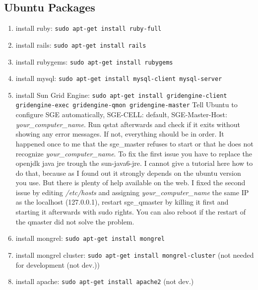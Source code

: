 \documentclass{scrartcl}
\begin{document}
			\subsection{Ubuntu Packages}
			\begin{enumerate}
				\item install ruby: \texttt{sudo apt-get install ruby-full}
				\item install rails: \texttt{sudo apt-get install rails}
				\item install rubygems: \texttt{sudo apt-get install rubygems}
				\item install mysql: \texttt{sudo apt-get install mysql-client mysql-server}
				\item install Sun Grid Engine: \texttt{sudo apt-get install gridengine-client  gridengine-exec    gridengine-qmon  gridengine-master} Tell Ubuntu to configure SGE automatically, SGE-CELL: default, SGE-Master-Host: \textit{your\_computer\_name}. Run qstat afterwards and check if it exits without showing any error messages. If not, everything should be in order. It happened once to me that the sge\_master refuses to start or that he does not recognize \textit{your\_computer\_name}. To fix the first issue you have to replace the openjdk java jre trough the sun-java6-jre. I cannot give a tutorial here how to do that, because as I found out it strongly depends on the ubuntu version you use. But there is plenty of help available on the web. I fixed the second issue by editing \textit{/etc/hosts} and assigning \textit{your\_computer\_name} the same IP as the localhost (127.0.0.1), restart sge\_qmaster by killing it first and starting it afterwards with sudo rights. You can also reboot if the restart of the qmaster did not solve the problem.
				\item install mongrel: \texttt{sudo apt-get install mongrel}
				\item install mongrel cluster: \texttt{sudo apt-get install mongrel-cluster} (not needed for development (not dev.))			
				\item install apache: \texttt{sudo apt-get install apache2} (not dev.)
				\end{enumerate}
				
\end{document}
